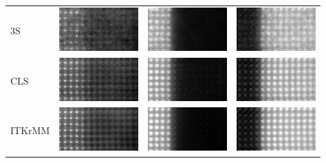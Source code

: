 \begin{tabular}{m{2cm}*{3}{M{0.24\textwidth}}}
    3S&
    \includegraphics[width=\tmplength]{img/chapitre4/figure9/img/SSS_band_0.png}&
    \includegraphics[width=\tmplength]{img/chapitre4/figure9/img/SSS_band_1.png}&
    \includegraphics[width=\tmplength]{img/chapitre4/figure9/img/SSS_band_2.png}\\
    CLS&
    \includegraphics[width=\tmplength]{img/chapitre4/figure9/img/FS3D_band_0.png}&
    \includegraphics[width=\tmplength]{img/chapitre4/figure9/img/FS3D_band_1.png}&
    \includegraphics[width=\tmplength]{img/chapitre4/figure9/img/FS3D_band_2.png}\\
    ITKrMM&
    \includegraphics[width=\tmplength]{img/chapitre4/figure9/img/ITKrMM_band_0.png}&
    \includegraphics[width=\tmplength]{img/chapitre4/figure9/img/ITKrMM_band_1.png}&
    \includegraphics[width=\tmplength]{img/chapitre4/figure9/img/ITKrMM_band_2.png}\\

\end{tabular}
